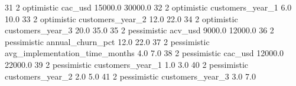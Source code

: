 \begin{APACode}
31         2   optimistic                         cac_usd   15000.0   30000.0   
32         2   optimistic                customers_year_1       6.0      10.0   
33         2   optimistic                customers_year_2      12.0      22.0   
34         2   optimistic                customers_year_3      20.0      35.0   
35         2  pessimistic                         acv_usd    9000.0   12000.0   
36         2  pessimistic                annual_churn_pct      12.0      22.0   
37         2  pessimistic  avg_implementation_time_months       4.0       7.0   
38         2  pessimistic                         cac_usd   12000.0   22000.0   
39         2  pessimistic                customers_year_1       1.0       3.0   
40         2  pessimistic                customers_year_2       2.0       5.0   
41         2  pessimistic                customers_year_3       3.0       7.0   


\end{APACode}
